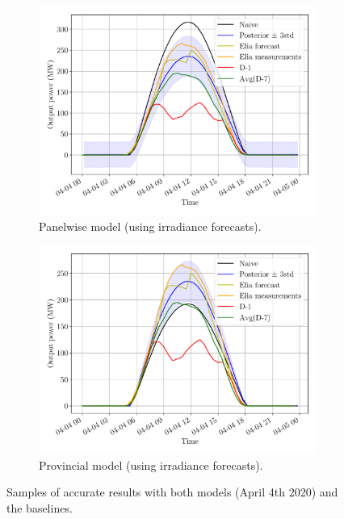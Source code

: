 \documentclass[a4paper, 12pt]{article}
\begin{document}
\begin{figure}[H]
	\centering
	\begin{subfigure}{0.48\textwidth}
		\centering
		\includegraphics[width=\textwidth]{resources/pdf/solar_panelwise (START_FOR 04-04-2020).pdf}
		\caption{Panelwise model (using irradiance forecasts).}
		\label{fig:panelwise_good_1}
	\end{subfigure}
	\hspace{0.5em}
	\begin{subfigure}{0.48\textwidth}
		\centering
		\includegraphics[width=\textwidth]{resources/pdf/solar_provincial (START_FOR 04-04-2020).pdf}
		\caption{Provincial model (using irradiance forecasts).}
		\label{fig:provincial_good_1}
	\end{subfigure}
	\caption{Samples of accurate results with both models (April 4th 2020) and the baselines.}
	\label{fig:good_results_april_4th}
\end{figure}
\end{document}
